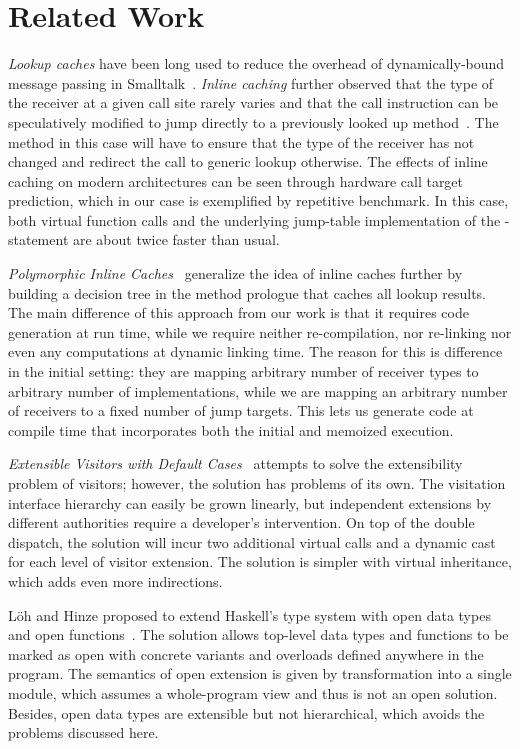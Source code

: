 \section{Related Work} %
\label{sec:rw}

\emph{Lookup caches} have been long used to reduce the overhead of 
dynamically-bound message passing in Smalltalk~\cite{UngarPatterson83}. 
\emph{Inline caching} further observed that the type of the receiver at a given 
call site rarely varies and that the call instruction can be speculatively 
modified to jump directly to a previously looked up method~\cite{Deutsch84}. 
The method in this case will have to ensure that the type of the receiver has 
not changed and redirect the call to generic lookup otherwise. The effects of 
inline caching on modern architectures can be seen through hardware call target 
prediction, which in our case is exemplified by repetitive benchmark. In this 
case, both virtual function calls and the underlying jump-table implementation of 
the -statement are about twice faster than usual.

\emph{Polymorphic Inline Caches}~\cite{Holzle:Chambers:Ungar:91} generalize the 
idea of inline caches further by building a decision tree in the method prologue 
that caches all lookup results. The main difference of this approach from our 
work is that it requires code generation at run time, while we require neither 
re-compilation, nor re-linking nor even any computations at dynamic linking 
time. The reason for this is difference in the initial setting: they are mapping 
arbitrary number of receiver types to arbitrary number of implementations, while 
we are mapping an arbitrary number of receivers to a fixed number of jump 
targets. This lets us generate code at compile time that incorporates both the 
initial and memoized execution.

\emph{Extensible Visitors with Default Cases}~\cite[]{Zenger:2001} attempts to solve the extensibility problem of visitors; 
however, the solution has problems of its own. The visitation interface 
hierarchy can easily be grown linearly, but independent extensions by different  
authorities require a developer's intervention. On top of the double dispatch, the 
solution will incur two additional virtual calls and a dynamic cast for each 
level of visitor extension. The solution is simpler with virtual inheritance, 
which adds even more indirections.

L\"{o}h and Hinze proposed to extend Haskell's type system with open data types 
and open functions~\cite{LohHinze2006}. The solution allows top-level data types 
and functions to be marked as open with concrete variants and overloads defined 
anywhere in the program. The semantics of open extension is given by 
transformation into a single module, which assumes a whole-program view and thus 
is not an open solution. Besides, open data types are extensible but not 
hierarchical, which avoids the problems discussed here.

